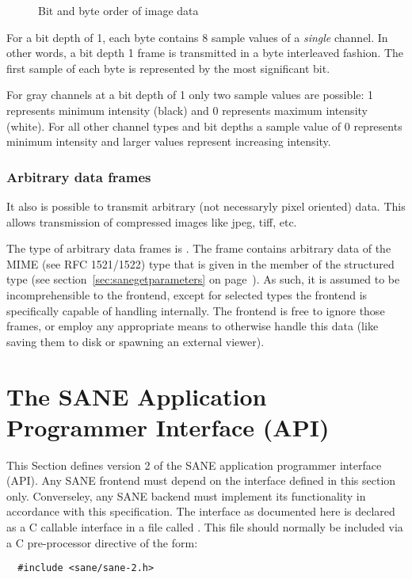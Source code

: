 \documentclass[11pt,DVIps]{report}
\begin{document}
\begin{figure}[htbp]
  \begin{center}
    \leavevmode
    \caption{Bit and byte order of image data}
    \label{fig:pixels}
  \end{center}
\end{figure}

For a bit depth of 1, each byte contains 8 sample values of a {\em single\/}
channel. In other words, a bit depth 1 frame is transmitted in a byte
interleaved fashion. The first sample of each byte is represented by the most
significant bit.

\begin{changebar}
For gray channels at a bit depth of 1 only two sample values are possible: 1
represents minimum intensity (black) and 0 represents maximum intensity
(white).  For all other channel types and bit depths a sample value of 0
represents minimum intensity and larger values represent increasing intensity.

\subsection{Arbitrary data frames}

It also is possible to transmit arbitrary (not necessaryly pixel oriented)
data. This allows transmission of compressed images like jpeg, tiff, etc.

The type of arbitrary data frames is .
The frame contains arbitrary data of the MIME (see RFC 1521/1522) type that is
given in the  member of the 
structured type (see section~\ref{sec:sanegetparameters} on
page~\pageref{sec:sanegetparameters}).  As such, it is assumed to be
incomprehensible to the frontend, except for selected types the frontend is
specifically capable of handling internally.  The frontend is free to ignore
those frames, or employ any appropriate means to otherwise handle this data
(like saving them to disk or spawning an external viewer).
\end{changebar}

\chapter{The SANE Application Programmer Interface (API)}\label{chap:api}

\begin{changebar}
This Section defines version 2 of the SANE application
programmer interface (API).  Any SANE frontend must depend on the
interface defined in this section only. Converseley, any SANE backend
must implement its functionality in accordance with this
specification. The interface as documented here is declared as a C
callable interface in a file called . This file should
normally be included via a C pre-processor directive of the form:
\begin{verbatim}
  #include <sane/sane-2.h>
\end{verbatim}
\end{changebar}
\end{document}
